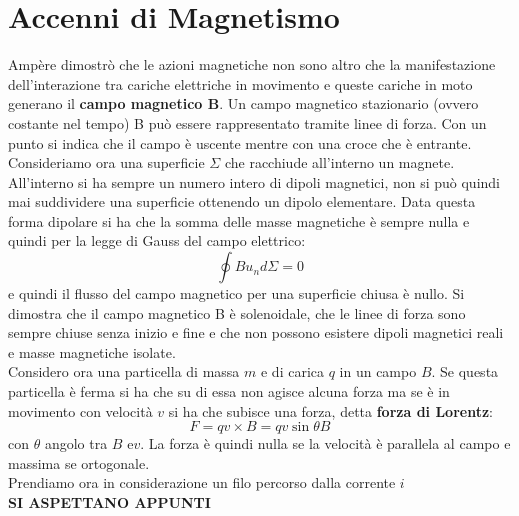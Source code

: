 \documentclass[a4paper,12pt, oneside]{book}
\begin{document}
\section{Accenni di Magnetismo}
Ampère dimostrò che le azioni magnetiche non sono altro che la manifestazione dell'interazione tra cariche elettriche in movimento e queste cariche in moto generano il \textbf{campo magnetico B}. Un campo magnetico stazionario (ovvero costante nel tempo) B può essere rappresentato tramite linee di forza. Con un punto si indica che il campo è uscente mentre con una croce che è entrante. \\
Consideriamo ora una superficie $\Sigma$ che racchiude all'interno un magnete. All'interno si ha sempre un numero intero di dipoli magnetici, non si può quindi mai suddividere una superficie ottenendo un dipolo elementare. Data questa forma dipolare si ha che la somma delle masse magnetiche è sempre nulla e quindi per la legge di Gauss del campo elettrico:
$$\oint Bu_nd\Sigma=0$$
e quindi il flusso del campo magnetico per una superficie chiusa è nullo. Si dimostra che il campo magnetico B è solenoidale, che le linee di forza sono sempre chiuse senza inizio e fine e che non possono esistere dipoli magnetici reali e masse magnetiche isolate.
\\Considero ora una particella di massa $m$ e di carica $q$ in un campo $B$. Se questa particella è ferma si ha che su di essa non agisce alcuna forza ma se è in movimento con velocità $v$ si ha che subisce una forza, detta \textbf{forza di Lorentz}:
$$F=qv\times B=qv\sin\theta B$$
con $\theta$ angolo tra $B$ e$v$. La forza è quindi nulla se la velocità è parallela al campo e massima se ortogonale. \\
Prendiamo ora in considerazione un filo percorso dalla corrente $i$\\
\textbf{SI ASPETTANO APPUNTI}
\end{document}
